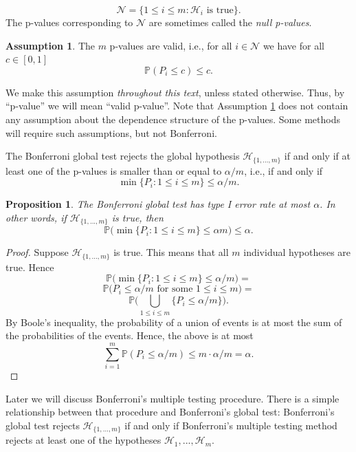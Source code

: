 \documentclass[11pt]{article}
\theoremstyle{plain}
\newtheorem{proposition}[theorem]{Proposition}
\theoremstyle{definition}
\newtheorem{assumption}{Assumption}[section]
\newcommand{\N}{\mathcal{N}}
\newcommand{\Hy}{\mathcal{H}}
\newcommand{\pr}{\mathbb{P}}
\begin{document}
$$\N = \{1\leq i \leq m: \Hy_i \text{ is true}\}.$$
The p-values corresponding to $\N$ are sometimes called the \emph{null p-values}.

\begin{assumption} \label{assvalidp}
The $m$ p-values are valid, i.e., for all $i\in \N$ we have for all $c\in [0,1]$
$$\pr(P_i\leq c)\leq c.$$
\end{assumption}

We make this assumption \emph{throughout this text}, unless stated otherwise. Thus, by ``p-value'' we will mean ``valid p-value''.
Note that Assumption \ref{assvalidp} does not contain any assumption about the dependence structure of the p-values. Some methods will require such assumptions, but not Bonferroni.

The Bonferroni global test rejects the global hypothesis $\Hy_{\{1,...,m\}}$ if and only if at least one of the p-values is smaller than or equal to $\alpha/m$, i.e., if and only if
$$\min\{P_i: 1\leq i \leq m\}\leq \alpha/ m.$$


\begin{proposition} \label{propBonferroniglobal}
The Bonferroni global test has type I error rate at most $\alpha$. In other words, if $\Hy_{\{1,...,m\}}$ is true, then  
$$\pr\Big(\min\{P_i: 1\leq i \leq m\}\leq \alpha m\Big)\leq \alpha.$$
\end{proposition}

\begin{proof}
Suppose $\Hy_{\{1,...,m\}}$ is true. This means that all $m$ individual hypotheses are true. Hence 
$$\pr\Big(\min\{P_i: 1\leq i \leq m\}\leq \alpha /m\Big) =$$
$$  \pr\Big(P_i\leq \alpha/ m \text{ for some } 1\leq i \leq m\Big)=$$
$$  \pr\Big(\bigcup_{1\leq i \leq m}    \{P_i\leq \alpha /m \}\Big).$$
By Boole's inequality, the probability of a union of events is at most the sum of the probabilities of the events. Hence, the above is at most
$$\sum_{i=1}^m  \pr(P_i\leq \alpha /m) \leq m\cdot \alpha /m =\alpha.$$

\end{proof}

Later we will discuss Bonferroni's multiple testing procedure. There is a simple relationship between that procedure and Bonferroni's global test: Bonferroni's global test rejects $\Hy_{\{1,...,m\}}$ if and only if Bonferroni's multiple testing method rejects at least one of the hypotheses $\Hy_1,...,\Hy_m$.
\end{document}
